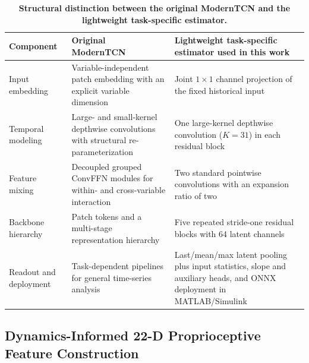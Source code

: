 \documentclass{ieeeaccess}
\newcommand{\citep}[1]{\cite{#1}}
\begin{document}
\begin{table}[!tbp]
\centering
\caption{\textbf{Structural distinction between the original ModernTCN and the lightweight task-specific estimator.}}
\label{tab:moderntcn_variant_comparison}
\setlength{\tabcolsep}{3pt}
\begin{tabular}{|p{}|p{}|p{}|}
\hline
Component & Original ModernTCN~\citep{Luo2024ModernTCN} & Lightweight task-specific estimator used in this work \\
\hline
Input embedding & Variable-independent patch embedding with an explicit variable dimension & Joint $1\times1$ channel projection of the fixed historical input \\
Temporal modeling & Large- and small-kernel depthwise convolutions with structural re-parameterization & One large-kernel depthwise convolution ($K=31$) in each residual block \\
Feature mixing & Decoupled grouped ConvFFN modules for within- and cross-variable interaction & Two standard pointwise convolutions with an expansion ratio of two \\
Backbone hierarchy & Patch tokens and a multi-stage representation hierarchy & Five repeated stride-one residual blocks with 64 latent channels \\
Readout and deployment & Task-dependent pipelines for general time-series analysis & Last/mean/max latent pooling plus input statistics, slope and auxiliary heads, and ONNX deployment in MATLAB/Simulink \\
\hline
\end{tabular}
\end{table}

\subsection{Dynamics-Informed 22-D Proprioceptive Feature Construction}
\end{document}

